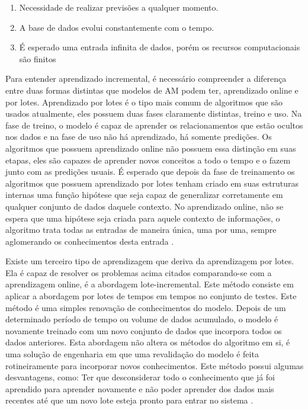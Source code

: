 \begin{enumerate}
\item Necessidade de realizar previsões a qualquer momento.
\item A base de dados evolui constantemente com o tempo.
\item É esperado uma entrada infinita de dados, porém os recursos computacionais são finitos
\end{enumerate}

Para entender aprendizado incremental, é necessário compreender a diferença entre duas formas distintas que modelos de AM podem ter, aprendizado online e por lotes. Aprendizado por lotes é o tipo mais comum de algoritmos que são usados atualmente, eles possuem duas fases claramente distintas, treino e uso. Na fase de treino, o modelo é capaz de aprender os relacionamentos que estão ocultos nos dados e na fase de uso não há aprendizado, há somente predições. Os algoritmos que possuem aprendizado online não possuem essa distinção em suas etapas, eles são capazes de aprender novos conceitos a todo o tempo e o fazem junto com as predições usuais. É esperado que depois da fase de treinamento os algoritmos que possuem aprendizado por lotes tenham criado em suas estruturas internas uma função hipótese que seja capaz de generalizar corretamente em qualquer conjunto de dados daquele contexto. No aprendizado online, não se espera que uma hipótese seja criada para aquele contexto de informações, o algoritmo trata todas as entradas de maneira única, uma por uma, sempre aglomerando os conhecimentos desta entrada \cite{from2009}. 

Existe um terceiro tipo de aprendizagem que deriva da aprendizagem por lotes. Ela é capaz de resolver os problemas acima citados comparando-se com a aprendizagem online, é a abordagem lote-incremental. Este método consiste em aplicar a abordagem por lotes de tempos em tempos no conjunto de testes. Este método é uma simples renovação de conhecimentos do modelo. Depois de um determinado período de tempo ou volume de dados acumulado, o modelo é novamente treinado com um novo conjunto de dados que incorpora todos os dados anteriores. Esta abordagem não altera os métodos do algoritmo em si, é uma solução de engenharia em que uma revalidação do modelo é feita rotineiramente para incorporar novos conhecimentos. Este método possui algumas desvantagens, como: Ter que desconsiderar todo o conhecimento que já foi aprendido para aprender novamente e não poder aprender dos dados mais recentes até que um novo lote esteja pronto para entrar no sistema \cite{batch2013}.

